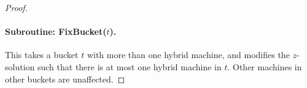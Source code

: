 \documentclass{article}[11pt]
\newcommand{\barcalS}{\bar{\cal S}\xspace}
\newcommand{\brt}{{(t)}}
\begin{document}
\begin{proof}
%	
\paragraph{Subroutine: {\sf FixBucket}($t$).} This takes a bucket $t$ with more than one hybrid machine, and modifies the $z$-solution such that
there is at most one hybrid machine in $t$. Other machines in other buckets are unaffected.

 
% 
	

\end{proof}
\end{document}
